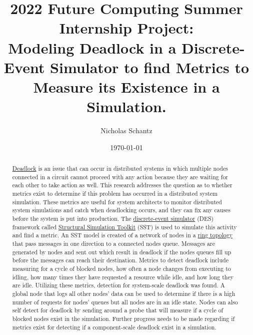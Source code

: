 \documentclass{article}
\begin{document}
%
%
%

    \begin{minipage}[h]{\textwidth}
        \title{2022 Future Computing Summer Internship Project:\\Modeling Deadlock in a Discrete-Event Simulator to find Metrics to Measure its Existence in a Simulation.}
        \author{Nicholas Schantz}
        \date{\today}
            \maketitle
        \begin{abstract}
            \href{https://en.wikipedia.org/wiki/Deadlock}{Deadlock} is an issue that can occur in distributed systems in which multiple nodes connected in a circuit cannot proceed with any action because they are waiting for each other to take action as well. This research addresses the question as to whether metrics exist to determine if this problem has occurred in a distributed system simulation. These metrics are useful for system architects to monitor distributed system simulations and catch when deadlocking occurs, and they can fix any causes before the system is put into production. The \href{https://en.wikipedia.org/wiki/Discrete-event_simulation}{discrete-event simulator} (DES) framework called \href{http://sst-simulator.org/}{Structural Simulation Toolkit} (SST) is used to simulate this activity and find a metric. An SST model is created of a network of nodes in a \href{https://en.wikipedia.org/wiki/Ring_network}{ring topology} that pass messages in one direction to a connected nodes queue. Messages are generated by nodes and sent out which result in deadlock if the nodes queues fill up before the messages can reach their destination. Metrics to detect deadlock include measuring for a cycle of blocked nodes, how often a node changes from executing to idling, how many times they have requested a resource while idle, and how long they are idle. Utilizing these metrics, detection for system-scale deadlock was found. A global node that logs all other nodes' data can be used to determine if there is a high number of requests for nodes' queues but all nodes are in an idle state. Nodes can also self detect for deadlock by sending around a probe that will measure if a cycle of blocked nodes exist in the simulation. Further progress needs to be made regarding if metrics exist for detecting if a component-scale deadlock exist in a simulation.
            
        \end{abstract}
    \end{minipage}
\end{document}
